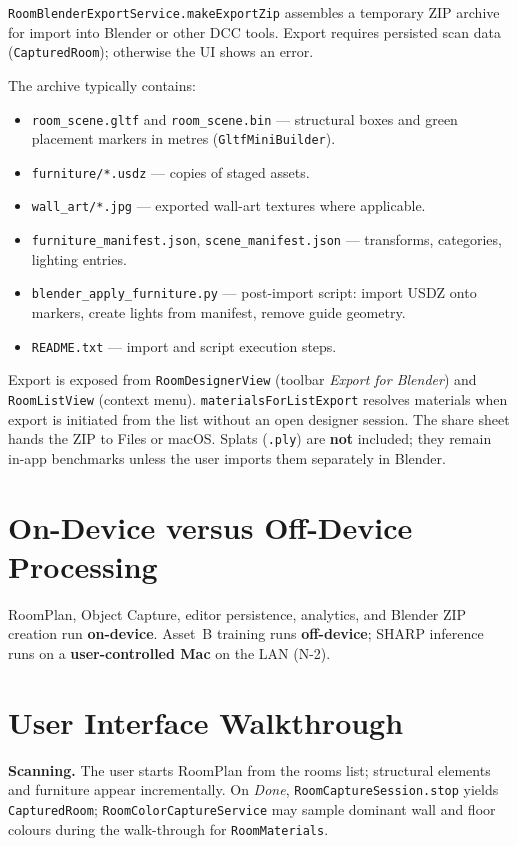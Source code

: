 \texttt{RoomBlenderExportService.makeExportZip} assembles a temporary ZIP archive for import into Blender or other DCC tools. Export requires persisted scan data (\texttt{CapturedRoom}); otherwise the UI shows an error.

The archive typically contains:

\begin{itemize}
    \item \texttt{room\_scene.gltf} and \texttt{room\_scene.bin} --- structural boxes and green placement markers in metres (\texttt{GltfMiniBuilder}).
    \item \texttt{furniture/*.usdz} --- copies of staged assets.
    \item \texttt{wall\_art/*.jpg} --- exported wall-art textures where applicable.
    \item \texttt{furniture\_manifest.json}, \texttt{scene\_manifest.json} --- transforms, categories, lighting entries.
    \item \texttt{blender\_apply\_furniture.py} --- post-import script: import USDZ onto markers, create lights from manifest, remove guide geometry.
    \item \texttt{README.txt} --- import and script execution steps.
\end{itemize}

Export is exposed from \texttt{RoomDesignerView} (toolbar \emph{Export for Blender}) and \texttt{RoomListView} (context menu). \texttt{materialsForListExport} resolves materials when export is initiated from the list without an open designer session. The share sheet hands the ZIP to Files or macOS. Splats (\texttt{.ply}) are \textbf{not} included; they remain in-app benchmarks unless the user imports them separately in Blender.

\section{On-Device versus Off-Device Processing}

RoomPlan, Object Capture, editor persistence, analytics, and Blender ZIP creation run \textbf{on-device}. Asset~B training runs \textbf{off-device}; SHARP inference runs on a \textbf{user-controlled Mac} on the LAN (N-2).

\section{User Interface Walkthrough}

\textbf{Scanning.} The user starts RoomPlan from the rooms list; structural elements and furniture appear incrementally. On \emph{Done}, \texttt{RoomCaptureSession.stop} yields \texttt{CapturedRoom}; \texttt{RoomColorCaptureService} may sample dominant wall and floor colours during the walk-through for \texttt{RoomMaterials}.

